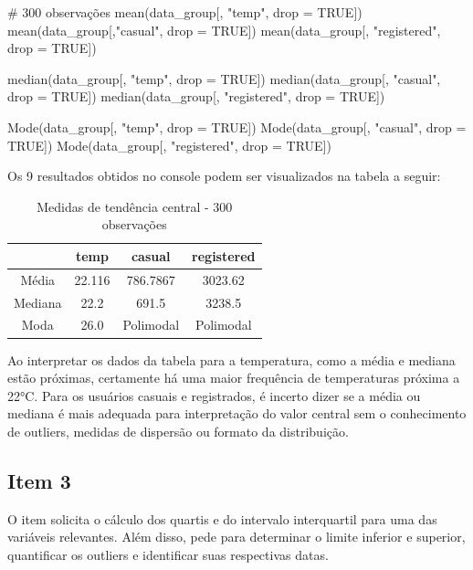 \documentclass[a4paper, 12pt, titlepage]{article}
\begin{document}
\begin{rcode}[firstnumber=35, caption={Cálculo das 300 observações (1)},breaklines=true, breakatwhitespace=true]
    # 300 observações
    mean(data_group[, "temp", drop = TRUE])
    mean(data_group[,"casual", drop = TRUE])
    mean(data_group[, "registered", drop = TRUE])

    median(data_group[, "temp", drop = TRUE])
    median(data_group[, "casual", drop = TRUE])
    median(data_group[, "registered", drop = TRUE])

    Mode(data_group[, "temp", drop = TRUE])
    Mode(data_group[, "casual", drop = TRUE])
    Mode(data_group[, "registered", drop = TRUE])
\end{rcode}

\noindent Os 9 resultados obtidos no console podem ser visualizados na tabela a seguir:
    \begin{table}[h!]
        \centering
        \caption{Medidas de tendência central - 300 observações}
        \label{tab:mascara_4u}
        \begin{tabular}{c|c|c|c}
            & temp & casual & registered \\\hline
            Média &22.116 &786.7867 &3023.62  \\ \hline
            Mediana &22.2 &691.5 &3238.5 \\ \hline 
            Moda &26.0 &Polimodal &Polimodal \\
        \end{tabular}
    \end{table}

Ao interpretar os dados da tabela para a temperatura, como a média e mediana estão próximas, certamente há uma maior frequência de temperaturas próxima a 22°C. Para os usuários casuais e registrados, é incerto dizer se a média ou mediana é mais adequada para interpretação do valor central sem o conhecimento de outliers, medidas de dispersão ou formato da distribuição.


\subsection*{Item 3}
O item solicita o cálculo dos quartis e do intervalo interquartil para uma das variáveis relevantes. Além disso, pede para determinar o limite inferior e superior, quantificar os outliers e identificar suas respectivas datas.
\end{document}
